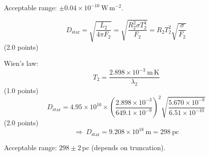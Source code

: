 \begin{description}
Acceptable range: $\pm 0.04\times 10^{-10}\ \mathrm{W\,m^{-2}}$.

\item[(T6.4)]
\[ D_{\mathrm{star}} = \sqrt{\frac{L_2}{4\pi F_2}}
   = \sqrt{\frac{R_2^2\sigma T_2^4}{F_2}}
   = R_2 T_2^2\sqrt{\frac{\sigma}{F_2}} \]
\hfill(2.0 points)

Wien's law:
\[ T_2 = \frac{2.898\times 10^{-3}\ \mathrm{m\,K}}{\lambda_2} \]
\hfill(1.0 points)
\[ D_{\mathrm{star}} = 4.95\times 10^{10}\times
   \left(\frac{2.898\times 10^{-3}}{649.1\times 10^{-9}}\right)^2
   \sqrt{\frac{5.670\times 10^{-8}}{6.51\times 10^{-10}}} \]
\hfill(2.0 points)
\[ \Rightarrow\ D_{\mathrm{star}} = 9.208\times 10^{18}\ \mathrm{m}
   = 298\ \mathrm{pc} \]

Acceptable range: $298 \pm 2$\,pc (depends on truncation).
\end{description}

